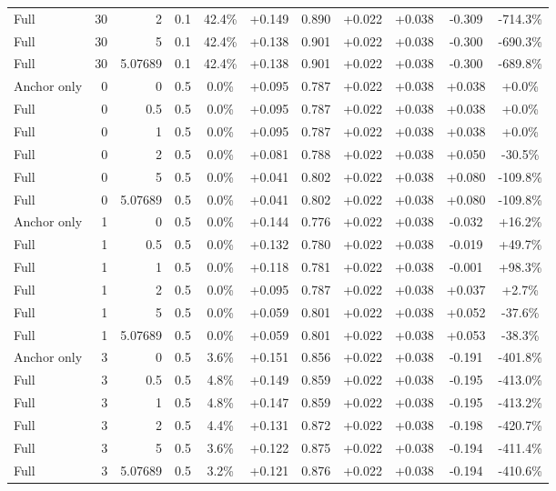\begin{table}[htbp]
\begin{tabular}{lrrrccccccc}
Full & 30 & 2 & 0.1 & 42.4\% & +0.149 & 0.890 & +0.022 & +0.038 & -0.309 & -714.3\% \\
Full & 30 & 5 & 0.1 & 42.4\% & +0.138 & 0.901 & +0.022 & +0.038 & -0.300 & -690.3\% \\
Full & 30 & 5.07689 & 0.1 & 42.4\% & +0.138 & 0.901 & +0.022 & +0.038 & -0.300 & -689.8\% \\
Anchor only & 0 & 0 & 0.5 & 0.0\% & +0.095 & 0.787 & +0.022 & +0.038 & +0.038 & +0.0\% \\
Full & 0 & 0.5 & 0.5 & 0.0\% & +0.095 & 0.787 & +0.022 & +0.038 & +0.038 & +0.0\% \\
Full & 0 & 1 & 0.5 & 0.0\% & +0.095 & 0.787 & +0.022 & +0.038 & +0.038 & +0.0\% \\
Full & 0 & 2 & 0.5 & 0.0\% & +0.081 & 0.788 & +0.022 & +0.038 & +0.050 & -30.5\% \\
Full & 0 & 5 & 0.5 & 0.0\% & +0.041 & 0.802 & +0.022 & +0.038 & +0.080 & -109.8\% \\
Full & 0 & 5.07689 & 0.5 & 0.0\% & +0.041 & 0.802 & +0.022 & +0.038 & +0.080 & -109.8\% \\
Anchor only & 1 & 0 & 0.5 & 0.0\% & +0.144 & 0.776 & +0.022 & +0.038 & -0.032 & +16.2\% \\
Full & 1 & 0.5 & 0.5 & 0.0\% & +0.132 & 0.780 & +0.022 & +0.038 & -0.019 & +49.7\% \\
Full & 1 & 1 & 0.5 & 0.0\% & +0.118 & 0.781 & +0.022 & +0.038 & -0.001 & +98.3\% \\
Full & 1 & 2 & 0.5 & 0.0\% & +0.095 & 0.787 & +0.022 & +0.038 & +0.037 & +2.7\% \\
Full & 1 & 5 & 0.5 & 0.0\% & +0.059 & 0.801 & +0.022 & +0.038 & +0.052 & -37.6\% \\
Full & 1 & 5.07689 & 0.5 & 0.0\% & +0.059 & 0.801 & +0.022 & +0.038 & +0.053 & -38.3\% \\
Anchor only & 3 & 0 & 0.5 & 3.6\% & +0.151 & 0.856 & +0.022 & +0.038 & -0.191 & -401.8\% \\
Full & 3 & 0.5 & 0.5 & 4.8\% & +0.149 & 0.859 & +0.022 & +0.038 & -0.195 & -413.0\% \\
Full & 3 & 1 & 0.5 & 4.8\% & +0.147 & 0.859 & +0.022 & +0.038 & -0.195 & -413.2\% \\
Full & 3 & 2 & 0.5 & 4.4\% & +0.131 & 0.872 & +0.022 & +0.038 & -0.198 & -420.7\% \\
Full & 3 & 5 & 0.5 & 3.6\% & +0.122 & 0.875 & +0.022 & +0.038 & -0.194 & -411.4\% \\
Full & 3 & 5.07689 & 0.5 & 3.2\% & +0.121 & 0.876 & +0.022 & +0.038 & -0.194 & -410.6\% \\

\end{tabular}
\end{table}
